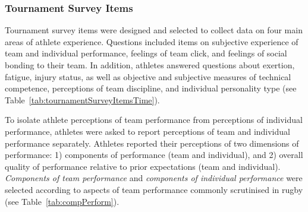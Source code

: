 \begin{CJK}{UTF8}{gbsn}



\subsubsection{Tournament Survey Items\label{survey:Tournament Survey Items}}

Tournament survey items were designed and selected to collect data on four main areas of athlete experience.  Questions included items on subjective experience of team and individual performance, feelings of team click, and feelings of social bonding to their team.  In addition, athletes answered questions about exertion, fatigue, injury status, as well as objective and subjective measures of technical competence, perceptions of team discipline, and individual personality type (see Table~\ref{tab:tournamentSurveyItemsTime}).






To isolate athlete perceptions of team performance from perceptions of individual performance, athletes were asked to report perceptions of team and individual performance separately.  Athletes reported their perceptions of two dimensions of performance: 1) components of performance (team and individual), and 2) overall quality of performance relative to prior expectations (team and individual).  \textit{Components of team performance} and \textit{components of individual performance} were selected according to aspects of team performance commonly scrutinised in rugby (see Table~\ref{tab:compPerform}).


\end{CJK}
